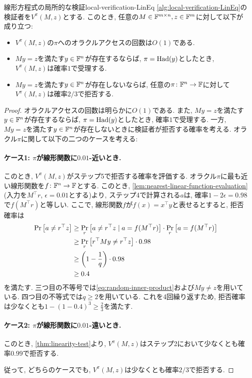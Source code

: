 \begin{theorem}{線形方程式の局所的な検証}{local-verification-LinEq}
  \cref{alg:local-verification-LinEq}の検証者を$V^\pi(M,z)$とする.
  このとき, 任意の$M\in\mathbb{F}^{m\times n},z\in\mathbb{F}^m$に対して以下が成り立つ:
  \begin{itemize}
    \item $V^\pi(M,z)$の$\pi$へのオラクルアクセスの回数は$O(1)$である.
    \item $My=z$を満たす$y\in\mathbb{F}^n$が存在するならば, $\pi=\mathrm{Had}(y)$としたとき, $V^\pi(M,z)$は確率$1$で受理する.
    \item $My=z$を満たす$y\in\mathbb{F}^n$が存在しないならば, 任意の$\pi\colon\mathbb{F}^n\to\mathbb{F}$に対して$V^\pi(M,z)$は確率$2/3$で拒否する.
  \end{itemize}
\end{theorem}
\begin{proof}
  オラクルアクセスの回数は明らかに$O(1)$である.
  また, $My=z$を満たす$y\in\mathbb{F}^n$が存在するならば, $\pi=\mathrm{Had}(y)$としたとき, 確率$1$で受理する.
  一方, $My=z$を満たす$y\in\mathbb{F}^n$が存在しないときに検証者が拒否する確率を考える.
  オラクル$\pi$に関して以下の二つのケースを考える:

  \paragraph*{ケース1: $\pi$が線形関数に$0.01$-近いとき.}
  このとき, $V^\pi(M,z)$がステップ5で拒否する確率を評価する.
  オラクル$\pi$に最も近い線形関数を$f\colon \mathbb{F}^n\to\mathbb{F}$とする.
  このとき, \cref{lem:nearest-linear-function-evaluation} (入力を$M^\top r$, $\epsilon=0.01$とする)より, ステップ4で計算される$a$は, 確率$1-2\epsilon=0.98$で$f(M^\top r)$と等しい.
  ここで, 線形関数$f$が$f(x)=x^\top y$と表せるとすると, 拒否確率は
  \begin{align*}
    \Pr\qty[ a \ne r^\top z ] &\ge \Pr_{r}\qty[ a\ne r^\top z \mid a = f(M^\top r) ] \cdot \Pr_{r}\qty[ a = f(M^\top r) ] \\
    &\ge \Pr_{r}\qty[ r^\top M y \ne r^\top z ]\cdot 0.98 \\
    &\ge \qty(1-\frac{1}{q}) \cdot 0.98 \\
    &\ge 0.4
  \end{align*}
  を満たす.
  三つ目の不等号では\cref{eq:random-inner-product}および$My\ne z$を用いている.
  四つ目の不等式では$q\ge 2$を用いている.
  これを4回繰り返すため, 拒否確率は少なくとも$1-(1-0.4)^3\ge \frac{2}{3}$を満たす.
  

  \paragraph*{ケース2: $\pi$が線形関数に$0.01$-遠いとき.}
  このとき, \cref{thm:linearity-test}より, $V^\pi(M,z)$はステップ2において少なくとも確率$0.99$で拒否する.
  
  従って, どちらのケースでも, $V^\pi(M,z)$は少なくとも確率$2/3$で拒否する.
  
\end{proof}

